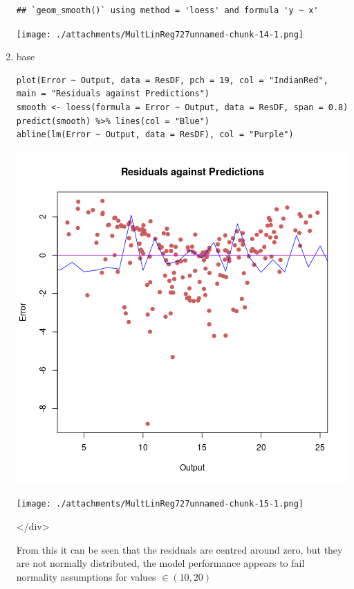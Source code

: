 \documentclass[11pt]{article}
\begin{document}
\begin{enumerate}
\begin{verbatim}
## `geom_smooth()` using method = 'loess' and formula 'y ~ x'
\end{verbatim}

\begin{center}
\texttt{[image: ./attachments/MultLinReg727unnamed-chunk-14-1.png]}
\end{center}

\item base
\label{sec:org16d78cc}
\begin{verbatim}
plot(Error ~ Output, data = ResDF, pch = 19, col = "IndianRed", main = "Residuals against Predictions")
smooth <- loess(formula = Error ~ Output, data = ResDF, span = 0.8)
predict(smooth) %>% lines(col = "Blue")
abline(lm(Error ~ Output, data = ResDF), col = "Purple")
\end{verbatim}

\begin{center}
\includegraphics[width=.9\linewidth]{ResidualAgainstPredMultLinReg.png}
\end{center}

\begin{center}
\texttt{[image: ./attachments/MultLinReg727unnamed-chunk-15-1.png]}
\end{center}

\begin{HTML}
</div>
\end{HTML}

From this it can be seen that the residuals are centred around zero, but
they are not normally distributed, the model performance appears to fail
normality assumptions for values \(\in \left( 10, 20 \right)\)
\end{enumerate}
\end{document}
